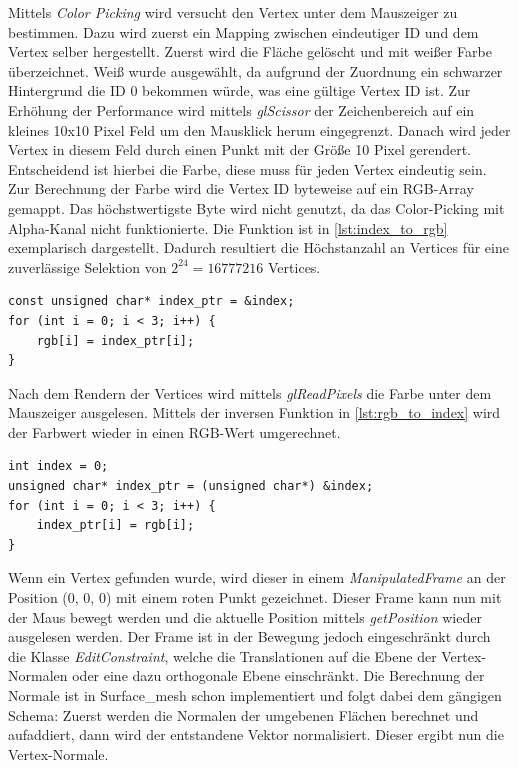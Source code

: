 Mittels \emph{Color Picking} wird versucht den Vertex unter dem Mauszeiger zu bestimmen.
Dazu wird zuerst ein Mapping zwischen eindeutiger ID und dem Vertex selber hergestellt.
Zuerst wird die Fläche gelöscht und mit weißer Farbe überzeichnet.
Weiß wurde ausgewählt, da aufgrund der Zuordnung ein schwarzer Hintergrund die ID 0 bekommen würde, was eine gültige Vertex ID ist.
Zur Erhöhung der Performance wird mittels \emph{glScissor} der Zeichenbereich auf ein kleines 10x10 Pixel Feld um den Mausklick herum eingegrenzt.
Danach wird jeder Vertex in diesem Feld durch einen Punkt mit der Größe 10 Pixel gerendert.
Entscheidend ist hierbei die Farbe, diese muss für jeden Vertex eindeutig sein.
Zur Berechnung der Farbe wird die Vertex ID byteweise auf ein RGB-Array gemappt.
Das höchstwertigste Byte wird nicht genutzt, da das Color-Picking mit Alpha-Kanal nicht funktionierte.
Die Funktion ist in \autoref{lst:index_to_rgb} exemplarisch dargestellt.
Dadurch resultiert die Höchstanzahl an Vertices für eine zuverlässige Selektion von $2^{24} = 16777216$ Vertices.

\begin{lstlisting}[style=myCppStyle, caption={Umrechnung Index nach Farbwert}, label=lst:index_to_rgb]
const unsigned char* index_ptr = &index;
for (int i = 0; i < 3; i++) {
	rgb[i] = index_ptr[i];
}
\end{lstlisting}

Nach dem Rendern der Vertices wird mittels \emph{glReadPixels} die Farbe unter dem Mauszeiger ausgelesen.
Mittels der inversen Funktion in \autoref{lst:rgb_to_index} wird der Farbwert wieder in einen RGB-Wert umgerechnet.

\begin{lstlisting}[style=myCppStyle, caption={Inverse Funktion Farbwert nach Index}, label=lst:rgb_to_index]
int index = 0;
unsigned char* index_ptr = (unsigned char*) &index;
for (int i = 0; i < 3; i++) {
	index_ptr[i] = rgb[i];
}
\end{lstlisting}

Wenn ein Vertex gefunden wurde, wird dieser in einem \emph{ManipulatedFrame} an der Position (0, 0, 0) mit einem roten Punkt gezeichnet. 
Dieser Frame kann nun mit der Maus bewegt werden und die aktuelle Position mittels \emph{getPosition} wieder ausgelesen werden.
Der Frame ist in der Bewegung jedoch eingeschränkt durch die Klasse \emph{EditConstraint}, welche die Translationen auf die Ebene der Vertex-Normalen oder eine dazu orthogonale Ebene einschränkt.
Die Berechnung der Normale ist in Surface\_mesh schon implementiert und folgt dabei dem gängigen Schema:
Zuerst werden die Normalen der umgebenen Flächen berechnet und aufaddiert, dann wird der entstandene Vektor normalisiert. 
Dieser ergibt nun die Vertex-Normale.

